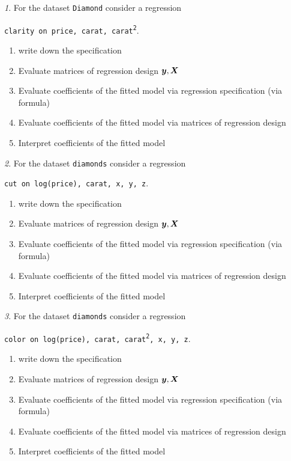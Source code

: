 \documentclass[12pt]{article}
\theoremstyle{remark}
\newtheorem{problem}{}[section]
\begin{document}
\begin{problem}
For the dataset \texttt{Diamond} consider a regression
\begin{center}
	\texttt{clarity on price, carat, carat\textsuperscript{2}}.
\end{center}
\begin{enumerate}
	\item write down the specification
	\item Evaluate matrices of regression design \({\bm y}, {\bm X}\)
	\item Evaluate coefficients of the fitted model via 
	regression specification (via formula)
	\item Evaluate coefficients of the fitted model via 
	matrices of regression design
	\item Interpret coefficients of the fitted model
\end{enumerate}
\end{problem}

\begin{problem}
For the dataset \texttt{diamonds} consider a regression
\begin{center}
	\texttt{cut on log(price), carat, x, y, z}.
\end{center}
\begin{enumerate}
	\item write down the specification
	\item Evaluate matrices of regression design \({\bm y}, {\bm X}\)
	\item Evaluate coefficients of the fitted model via 
	regression specification (via formula)
	\item Evaluate coefficients of the fitted model via 
	matrices of regression design
	\item Interpret coefficients of the fitted model
\end{enumerate}
\end{problem}

\begin{problem}
For the dataset \texttt{diamonds} consider a regression
\begin{center}
	\texttt{color on log(price), carat, carat\textsuperscript{2}, x, y, z}.
\end{center}
\begin{enumerate}
	\item write down the specification
	\item Evaluate matrices of regression design \({\bm y}, {\bm X}\)
	\item Evaluate coefficients of the fitted model via 
	regression specification (via formula)
	\item Evaluate coefficients of the fitted model via 
	matrices of regression design
	\item Interpret coefficients of the fitted model
\end{enumerate}
\end{problem}
\end{document}
